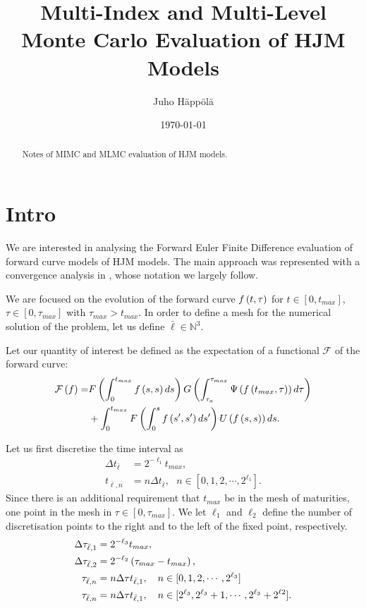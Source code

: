 \documentclass[11pt]{amsart}
\title[MIMC and MLMC HJM]{Multi-Index and Multi-Level Monte Carlo Evaluation of HJM Models}
\author{Juho H\"app\"ol\"a}
\date{\today}
\begin{document}
\begin{abstract}
Notes of MIMC and MLMC evaluation of HJM models.
\end{abstract}

\maketitle

\section{Intro}

We are interested in analysing the Forward Euler Finite Difference evaluation of forward curve models of HJM models. The main approach was represented with a convergence analysis in \cite{bjork2013monte}, whose notation we largely follow.

We are focused on the evolution of the forward curve $f \left( {t , \tau} \right)$ for $t \in [0,t_{max}]$, $\tau \in [0,\tau_{max}]$ with $\tau_{max}>t_{max}$. In order to define a mesh for the numerical solution of the problem, let us define $\bar \ell \in \mathbb{N}^3$.

Let our quantity of interest be defined as the expectation of a functional $\mathcal F$
of the forward curve:
\begin{align*}
\mathcal F \left( {f} \right) =& F \left( {\int_0 ^{t_{max}} f \left( {s,s} \right) ds} \right)
G \left( { \int_{\tau_a}^{\tau_{max}} \Psi \left( {f \left( {t_{max},\tau} \right)} \right) d\tau } \right)
\\
&+
\int_{0}^{t_{max}} F \left( {\int_0^{s} f \left( {s',s'} \right) ds'} \right) U \left( {f\left( {s,s} \right)} \right) ds.
\end{align*}

Let us first discretise the time interval as
\begin{align*}
\Delta t_{\bar \ell} &= 2^{-\ell_1} t_{max},
\\
t_{\bar \ell, n} &= n \Delta t_{\bar \ell}, ~~~ n \in [0,1,2,\cdots, 2^{\ell_1}].
\end{align*}
Since there is an additional requirement that $t_{max}$ be in
the mesh of maturities, one point in the mesh in $\tau \in [0,\tau_{max}]$. We let $\ell_1$ and $\ell_2$ define the number of discretisation points to the right and to the left of the fixed
point, respectively.
\begin{align*}
\Delta \tau_{\bar \ell,1} &= 2^{-\ell_3} t_{max},  \\
\Delta \tau_{\bar \ell,2} &= 2^{-\ell_2} \left( {\tau_{max}-t_{max}} \right), \\
\tau_{\bar \ell, n} &= n \Delta \tau t_{\bar \ell,1}, ~~~ n \in [0,1,2,\cdots, 2^{\ell_3}] \\
\tau_{\bar \ell, n} &= n \Delta \tau t_{\bar \ell,1}, ~~~ n \in [2^{\ell_3},2^{\ell_3}+1,\cdots, 2^{\ell_3}+2^{\ell 2}].
\end{align*}
\end{document}
